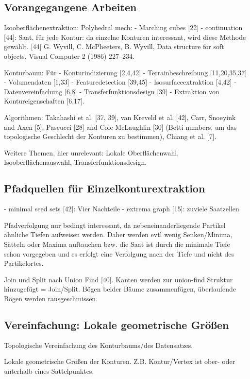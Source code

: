\subsection{Vorangegangene Arbeiten}
\cite[S.~45]{carr2010flexibleIsosurfaces}

Isooberflächenextraktion: Polyhedral mech:
- Marching cubes [22]
- continuation [44]: Saat, für jede Kontur: da einzelne Konturen interessant, wird diese Methode gewählt.
[44] G. Wyvill, C. McPheeters, B. Wyvill, Data structure for soft objects, Visual Computer 2 (1986) 227–234.


Konturbaum: Für
- Konturindizierung [2,4,42]
- Terrainbeschreibung [11,20,35,37]
- Volumendaten [1,33]
- Featuredetection [39,45]
- Isosurfaceextraktion [4,42]
- Datenvereinfachung [6,8]
- Transferfunktionsdesign [39]
- Extraktion von Kontureigenschaften [6,17].

Algorithmen:
Takahashi et al. [37, 39], van Kreveld et al. [42], Carr, Snoeyink and Axen [5], Pascucci [28] and Cole-McLaughlin [30] (Betti numbers, um das topologische Geschlecht der Konturen zu bestimmen), Chiang et al. [7].

Weitere Themen, hier unrelevant: Lokale Oberflächenwahl, Isooberflächenauswahl, Transferfunktionsdesign.

\subsection{Pfadquellen für Einzelkonturextraktion}
- minimal seed sets [42]: Vier Nachteile
- extrema graph [15]: zuviele Saatzellen

Pfadverfolgung nur bedingt interessant, da nebeneinanderliegende Partikel ähnliche Tiefen aufweisen werden. Daher werden evtl wenig Senken/Minima, Sätteln oder Maxima auftauchen bzw. die Saat ist durch die minimale Tiefe schon vorgegeben und es erfolgt eine Verfolgung nach der Tiefe und nicht des Partikelortes.

Join und Split nach Union Find [40]. Kanten werden zur union-find Struktur hinzugefügt = Join/Split. Bögen beider Bäume zusammenfügen, überlaufende Bögen werden rausgeschmissen.

\subsection{Vereinfachung: Lokale geometrische Größen}
Topologische Vereinfachung des Konturbaums/des Datensatzes.

Lokale geometrische Größen der Konturen. Z.B. Kontur/Vertex ist ober- oder unterhalb eines Sattelpunktes.


